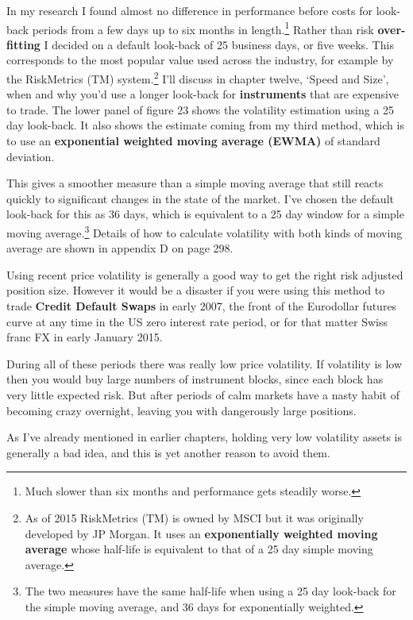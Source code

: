 In my research I found almost no difference in performance before costs for look-back periods from a few days up to six months in length.\footnote{Much slower than six months and performance gets steadily worse.} Rather than risk \textbf{over-fitting} I decided on a default look-back of 25 business days, or five weeks. This corresponds to the most popular value used across the industry, for example by the RiskMetrics (TM) system.\footnote{As of 2015 RiskMetrics (TM) is owned by MSCI but it was originally developed by JP Morgan. It uses an \textbf{exponentially weighted moving average} whose half-life is equivalent to that of a 25 day simple moving average.} I'll discuss in chapter twelve, ‘Speed and Size', when and why you'd use a longer look-back for \textbf{instruments} that are expensive to trade. The lower panel of figure 23 shows the volatility estimation using a 25 day look-back. It also shows the estimate coming from my third method, which is to use an \textbf{exponential weighted moving average (EWMA)} of standard deviation.

This gives a smoother measure than a simple moving average that still reacts quickly to significant changes in the state of the market. I've chosen the default look-back for this as 36 days, which is equivalent to a 25 day window for a simple moving average.\footnote{The two measures have the same half-life when using a 25 day look-back for the simple moving average, and 36 days for exponentially weighted.} Details of how to calculate volatility with both kinds of moving average are shown in appendix D on page 298.

Using recent price volatility is generally a good way to get the right risk adjusted position size. However it would be a disaster if you were using this method to trade \textbf{Credit Default Swaps} in early 2007, the front of the Eurodollar futures curve at any time in the US zero interest rate period, or for that matter Swiss franc FX in early January 2015.

During all of these periods there was really low price volatility. If volatility is low then you would buy large numbers of instrument blocks, since each block has very little expected risk. But after periods of calm markets have a nasty habit of becoming crazy overnight, leaving you with dangerously large positions.

As I've already mentioned in earlier chapters, holding very low volatility assets is generally a bad idea, and this is yet another reason to avoid them.

